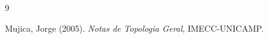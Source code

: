 \documentclass[a4paper, 17pt]{extarticle}
\begin{document}
{\small
  
  
  
  
  
  
  
}


{\small
\begin{thebibliography}{9}


Mujica, Jorge (2005). \textit{Notas de Topologia Geral}, IMECC-UNICAMP.

\end{thebibliography}
}


\end{document}
